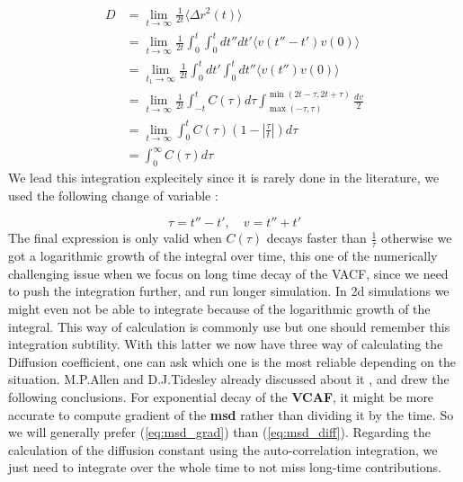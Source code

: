 \documentclass[ansiapaper]{report}
\begin{document}
\begin{multicols}{3}
\begin{align*}
    D &= \lim_{t \rightarrow \infty} \frac{1}{2t} \langle \Delta r^2(t) \rangle \\
    &= \lim_{t \rightarrow \infty} \frac{1}{2t} \int_{0}^{t} \int_{0}^{t} dt'' dt' \langle v(t'' - t')v(0) \rangle \\
    &= \lim_{t_1 \rightarrow \infty} \frac{1}{2t} \int_{0}^{t} dt' \int_{0}^{t} dt'' \langle v(t'')v(0) \rangle \\
    &= \lim_{t \rightarrow \infty} \frac{1}{2t} \int_{-t}^{t} C(\tau) d \tau \int_{\max(- \tau,\tau)}^{\min(2t - \tau, 2t + \tau)} \frac{dv}{2}\\
    &= \lim_{t \rightarrow \infty} \int_{0}^{t} C(\tau) (1 - |\frac{\tau}{t}|)d \tau \\
    &= \int_{0}^{\infty} C(\tau) d \tau
\end{align*}
We lead this integration explecitely since it is rarely done in the literature, we used the following change of variable : 

 $$ \tau = t'' - t' , \quad v = t'' + t'$$
 The final expression is only valid when $C(\tau)$ decays faster than $\frac{1}{\tau}$ otherwise we got a logarithmic growth of the integral over time, this one of the numerically challenging issue when we focus on long time decay of the VACF, since we need to push the integration further, and run longer simulation. In 2d simulations we might even not be able to integrate because of the logarithmic growth of the integral. This way of calculation is commonly use but one should remember this integration subtility. With this latter  we now have three way of calculating the Diffusion coefficient, one can ask which one is the most reliable depending on the situation. M.P.Allen and D.J.Tidesley already discussed about it \cite{Correlation}, and drew the following conclusions. For exponential decay of the \textbf{VCAF}, it might be more accurate to compute gradient of the \textbf{msd} rather than dividing it by the time. So we will generally prefer (\ref{eq:msd_grad}) than (\ref{eq:msd_diff}). Regarding the calculation of the diffusion constant using the auto-correlation integration, we just need to integrate over the whole time to not miss long-time contributions. 


\end{multicols}
\end{document}
